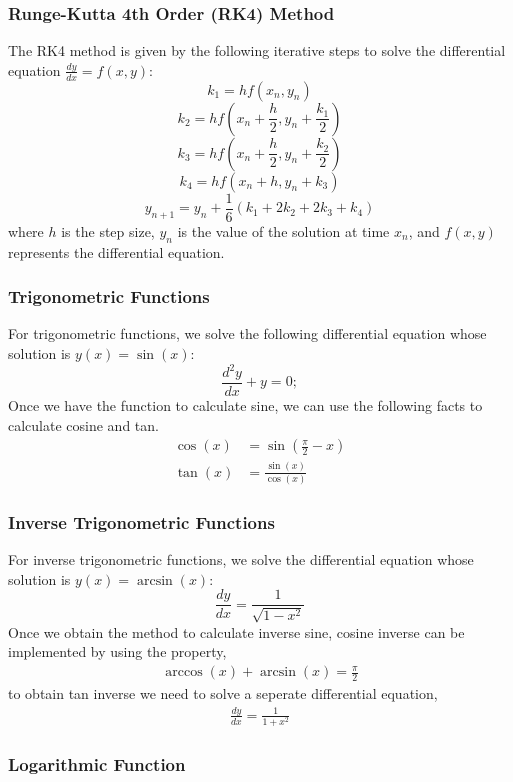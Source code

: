 \documentclass[a4paper,12pt]{article}
\begin{document}
\subsubsection*{Runge-Kutta 4th Order (RK4) Method}

The RK4 method is given by the following iterative steps to solve the differential equation \( \frac{dy}{dx} = f(x, y) \):
\[
k_1 = h f(x_n, y_n)
\]
\[
k_2 = h f\left( x_n + \frac{h}{2}, y_n + \frac{k_1}{2} \right)
\]
\[
k_3 = h f\left( x_n + \frac{h}{2}, y_n + \frac{k_2}{2} \right)
\]
\[
k_4 = h f(x_n + h, y_n + k_3)
\]
\[
y_{n+1} = y_n + \frac{1}{6} \left( k_1 + 2k_2 + 2k_3 + k_4 \right)
\]
where \( h \) is the step size, \( y_n \) is the value of the solution at time \( x_n \), and \( f(x, y) \) represents the differential equation.

\subsubsection{Trigonometric Functions}

For trigonometric functions, we solve the following differential equation whose solution is \( y(x) = \sin(x) \):
\[
\frac{d^2y}{dx} + y = 0;
\]
 Once we have the function to calculate sine, we can use the following facts to calculate cosine and tan. 
\begin{align*} 
 \cos(x) &= \sin \left( \frac{\pi}{2} - x \right)\\ 
 \tan(x) &= \frac{\sin(x)}{\cos(x)}
\end{align*}

\subsubsection{Inverse Trigonometric Functions}

For inverse trigonometric functions, we solve the differential equation whose solution is \( y(x) = \arcsin(x) \):
\[
\frac{dy}{dx} = \frac{1}{\sqrt{1 - x^2}}
\]
Once we obtain the method to calculate inverse sine, cosine inverse can be implemented by using the property, 
\begin{align*}
    \arccos(x) + \arcsin(x) = \frac{\pi}{2}
\end{align*}
to obtain tan inverse we need to solve a seperate differential equation,
\begin{align*}
    \frac{dy}{dx} = \frac{1}{1+x^2}
\end{align*}
\subsubsection{Logarithmic Function}
\end{document}
